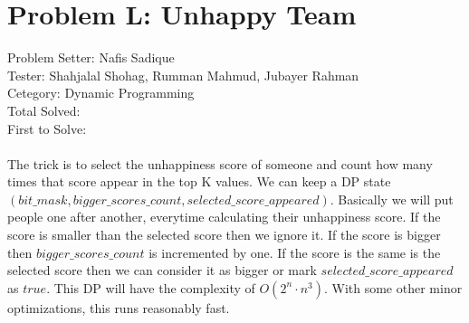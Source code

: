 \documentclass[11pt,a4paper]{article}
\begin{document}
\section*{Problem L: Unhappy Team}
Problem Setter: Nafis Sadique \\
Tester: Shahjalal Shohag, Rumman Mahmud, Jubayer Rahman \\
Cetegory: Dynamic Programming \\
Total Solved:  \\
First to Solve: \\
\\ 
The trick is to select the unhappiness score of someone and count how many times that score appear
in the top K values. We can keep a DP state $(bit\_mask, bigger\_scores\_count, selected\_score\_appeared)$.
Basically we will put people one after another, everytime calculating their unhappiness score. If the 
score is smaller than the selected score then we ignore it. If the score is bigger then $bigger\_scores\_count$
is incremented by one. If the score is the same is the selected score then we can consider it as bigger or 
mark $selected\_score\_appeared$ as $true$. This DP will have the complexity of $O(2^n\cdot n^3)$. With some
other minor optimizations, this runs reasonably fast.
\end{document}
